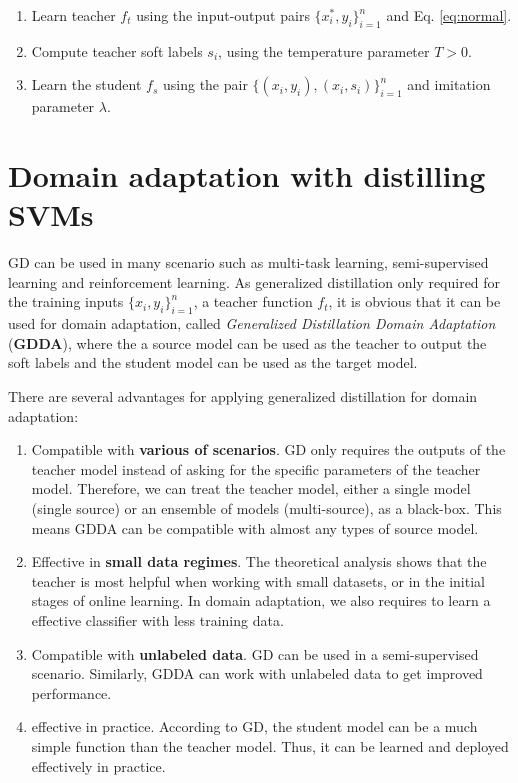 \documentclass[11pt,onecolumn]{article}
\begin{document}
\begin{enumerate}
\item Learn teacher ${f}_t$ using the input-output pairs $\{x^*_i,y_i\}_{i=1}^n$ and Eq. \ref{eq:normal}.
\item Compute teacher soft labels $s_i$, using the temperature parameter $T > 0$.
\item Learn the student ${f}_s$ using the pair $\{\left(x_i,y_i\right),\left(x_i,s_i\right)\}_{i=1}^n$ and imitation parameter $\lambda$.
\end{enumerate}

\section{Domain adaptation with distilling SVMs}

GD can be used in many scenario such as multi-task learning, semi-supervised learning and reinforcement learning. As generalized distillation only required for the training inputs $\{x_i,y_i\}_{i=1}^n$, a teacher function $f_t$, it is obvious that it can be used for domain adaptation, called \textit{Generalized Distillation Domain Adaptation} (\textbf{GDDA}), where the a source model can be used as the teacher to output the soft labels and the student model can be used as the target model. 

There are several advantages for applying generalized distillation for domain adaptation:
\begin{enumerate}
\item Compatible with \textbf{various of scenarios}. GD only requires the outputs of the teacher model instead of asking for the specific parameters of the teacher model. Therefore, we can treat the teacher model, either a single model (single source) or an ensemble of models (multi-source), as a black-box. This means GDDA can be compatible with almost any types of source model.
\item Effective in \textbf{small data regimes}. The theoretical analysis shows that the teacher is most helpful when working with small datasets, or in the initial stages of online learning. In domain adaptation, we also requires to learn a effective classifier with less training data.
\item Compatible with \textbf{unlabeled data}. GD can be used in a semi-supervised scenario. Similarly, GDDA can work with unlabeled data to get improved performance.
\item effective in practice. According to GD, the student model can be a much simple function than the teacher model. Thus, it can be learned and deployed effectively in practice.
\end{enumerate}
\end{document}

